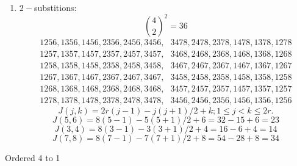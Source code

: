 \documentclass[aps, preprint]{revtex4}
\begin{document}
\begin{enumerate}
\item $2 -$substitions:
\begin{equation}\binom{4}{2}^{2} =36
\end{equation}
\begin{equation}\begin{array}{cc}1256,1356,1456,2356,2456,3456\text{,} & 3478,2478,2378,1478,1378,1278 \\
1257,1357,1457,2357,2457,3457\text{,} & 3468,2468,2368,1468,1368,1268 \\
1258,1358,1458,2358,2458,3458\text{,} & 3467,2467,2367,1467,1367,1267 \\
1267,1367,1467,2367,2467,3467\text{,} & 3458,2458,2358,1458,1358,1258 \\
1268,1368,1468,2368,2468,3468\text{,} & 3457,2457,2357,1457,1357,1257 \\
1278,1378,1478,2378,2478,3478\text{,} & 3456,2456,2356,1456,1356,1256\end{array}
\end{equation}
\begin{equation}J \left (j ,k\right ) =2 r \left (j -1\right ) -j \left (j +1\right )/2 +k ;1 \leq j <k \leq 2 r\text{.}
\end{equation}
\begin{equation}J \left (5 ,6\right ) =8 \left (5 -1\right ) -5 \left (5 +1\right )/2 +6 =32 -15 +6 =23
\end{equation}
\begin{equation}J \left (3 ,4\right ) =8 \left (3 -1\right ) -3 \left (3 +1\right )/2 +4 =16 -6 +4 =14
\end{equation}
\begin{equation}J \left (7 ,8\right ) =8 \left (7 -1\right ) -7 \left (7 +1\right )/2 +8 =54 -28 +8 =34
\end{equation}\end{enumerate}


Ordered 4 to 1 
\end{document}
